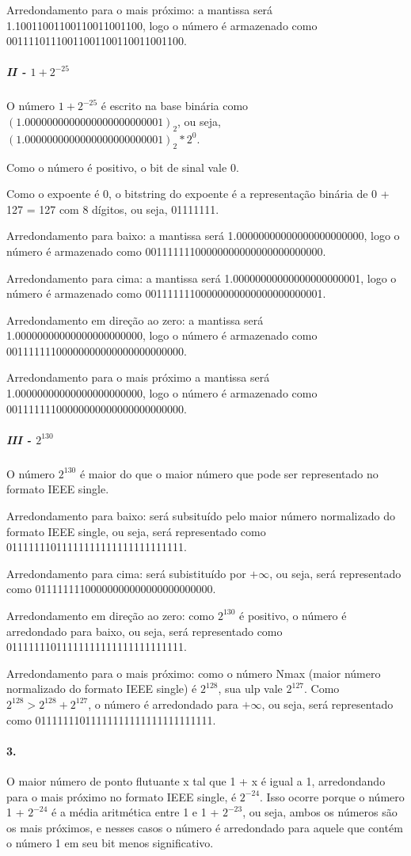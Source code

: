 \documentclass{article}
\begin{document}
 Arredondamento para o mais próximo: a mantissa será 1.10011001100110011001100, logo o número é armazenado como 00111101110011001100110011001100.
 
 \subparagraph{II - $1 + 2^{-25}$}
 O número $1 + 2^{-25}$ é escrito na base binária como $(1.0000000000000000000000001)_{2}$, ou seja, $(1.0000000000000000000000001)_{2} * 2^{0}$.
 
 Como o número é positivo, o bit de sinal vale 0.
 
 Como o expoente é 0, o bitstring do expoente é a representação binária de 0 + 127 = 127 com 8 dígitos, ou seja, 01111111.
 
 Arredondamento para baixo: a mantissa será 1.00000000000000000000000, logo o número é armazenado como 00111111100000000000000000000000.
 
 Arredondamento para cima: a mantissa será 1.00000000000000000000001, logo o número é armazenado como 00111111100000000000000000000001.
 
 Arredondamento em direção ao zero: a mantissa será 1.00000000000000000000000, logo o número é armazenado como 00111111100000000000000000000000.
 
 Arredondamento para o mais próximo a mantissa será 1.00000000000000000000000, logo o número é armazenado como 00111111100000000000000000000000.
 
\subparagraph{III - $2^{130}$}
O número $2^{130}$ é maior do que o maior número que pode ser representado no formato IEEE single.

Arredondamento para baixo: será subsituído pelo maior número normalizado do formato IEEE single, ou seja, será representado como 01111111011111111111111111111111.

Arredondamento para cima: será subistituído por $+\infty$, ou seja, será representado como 01111111100000000000000000000000.

Arredondamento em direção ao zero: como $2^{130}$ é positivo, o número é arredondado para baixo, ou seja, será representado como 01111111011111111111111111111111.

Arredondamento para o mais próximo: como o número Nmax (maior número normalizado do formato IEEE single) é $2^{128}$, sua ulp vale $2^{127}$. Como $2^{128} > 2^{128} + 2^{127}$, o número é arredondado para $+\infty$, ou seja, será representado como 01111111011111111111111111111111.

\paragraph*{3.}
O maior número de ponto flutuante x tal que 1 + x é igual a 1, arredondando para o mais próximo no formato IEEE single, é $2^{-24}$.
Isso ocorre porque o número 1 + $2^{-24}$ é a média aritmética entre 1 e 1 + $2^{-23}$, ou seja, ambos os números são os mais próximos, e nesses casos o número é arredondado para aquele que contém o número 1 em seu bit menos significativo.
\end{document}
